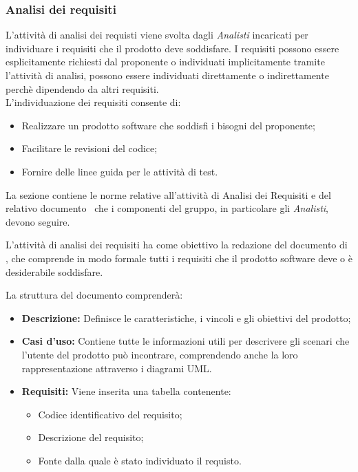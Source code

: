 \subsubsection{Analisi dei requisiti}
L'attività di analisi dei requisti viene svolta dagli \textit{Analisti} incaricati per individuare i requisiti che il prodotto deve soddisfare.
I requisiti possono essere esplicitamente richiesti dal proponente o individuati implicitamente tramite l'attività di analisi, possono essere individuati direttamente o indirettamente perchè dipendendo da altri requisiti. \\
L'individuazione dei requisiti consente di:
\begin{itemize}
	\item Realizzare un prodotto software che soddisfi i bisogni del proponente;
	\item Facilitare le revisioni del codice;
	\item Fornire delle linee guida per le attività di test.
\end{itemize}

La sezione contiene le norme relative all'attività di Analisi dei Requisiti e del relativo documento \AdRv\ che i componenti del gruppo, in particolare gli \textit{Analisti}, devono seguire.

L'attività di analisi dei requisiti ha come obiettivo la redazione del documento di \AdRv, che comprende in modo formale tutti i requisiti che il prodotto software deve o è desiderabile soddisfare.

La struttura del documento comprenderà:
\begin{itemize}
	\item \textbf{Descrizione:} Definisce le caratteristiche, i vincoli e gli obiettivi del prodotto;
	\item \textbf{Casi d'uso:} Contiene tutte le informazioni utili per descrivere gli scenari che l'utente del prodotto può incontrare, comprendendo anche la loro rappresentazione attraverso i diagrami UML.
	\item \textbf{Requisiti:} Viene inserita una tabella contenente:
	\begin{itemize}
		\item Codice identificativo del requisito;
		\item Descrizione del requisito;
		\item Fonte dalla quale è stato individuato il requisto. 
	\end{itemize} 
\end{itemize}

